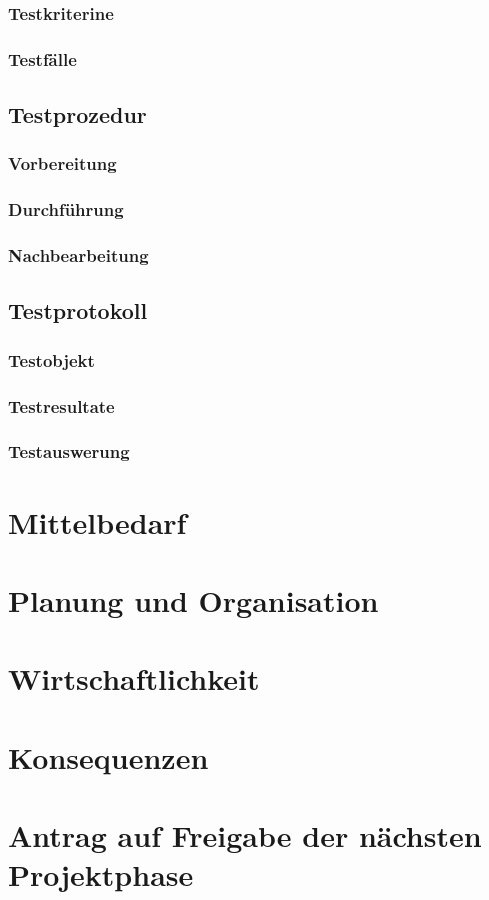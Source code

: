 \documentclass[10pt,paper=a4,final]{scrartcl}
\begin{document}
\subsubsection{Testkriterine}
\subsubsection{Testf\"alle}
\subsection{Testprozedur}
\subsubsection{Vorbereitung}
\subsubsection{Durchf\"uhrung}
\subsubsection{Nachbearbeitung}
\subsection{Testprotokoll}
\subsubsection{Testobjekt}
\subsubsection{Testresultate}
\subsubsection{Testauswerung}
\section{Mittelbedarf}
\section{Planung und Organisation}
\section{Wirtschaftlichkeit}
\section{Konsequenzen}
\section{Antrag auf Freigabe der n\"achsten Projektphase}
\end{document}
